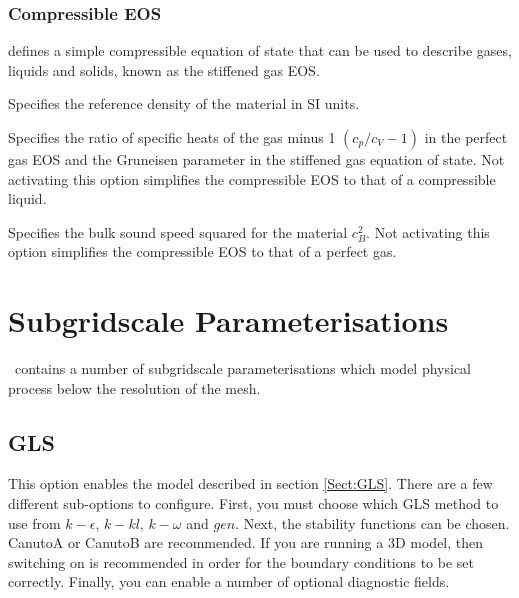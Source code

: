 \subsubsection{Compressible EOS}\label{Sect:Multi-material compressible EOS}
 defines a simple compressible equation of state that can be used to describe gases, liquids and solids, known as the stiffened gas EOS. %

\begin{description}
\item{} Specifies the reference density of the material in SI units.
\item{} Specifies the ratio of specific heats of the gas minus 1 $(c_p/c_V-1)$ in the perfect gas EOS and the Gruneisen parameter in the stiffened gas equation of state. Not activating this option simplifies the compressible EOS to that of a compressible liquid.
\item{} Specifies the bulk sound speed squared for the material $c_B^2$. Not activating this option simplifies the compressible EOS to that of a perfect gas.
\end{description}

\section{Subgridscale Parameterisations}

\fluidity\ contains a number of subgridscale parameterisations which model physical process below the resolution of the mesh.

\subsection{GLS}

This option enables the model described in section \ref{Sect:GLS}. There are a few different 
sub-options to configure. First, you must choose which GLS method to use 
from $k-\epsilon$, $k-kl$, $k-\omega$ and $gen$. Next, the stability functions
can be chosen. CanutoA or CanutoB are recommended. If you are running a 3D model, then switching on  
 is recommended in order for the boundary conditions to be set correctly. 
Finally, you can enable a number of optional diagnostic fields.

